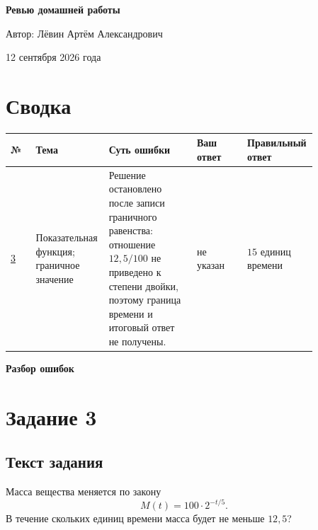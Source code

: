 \documentclass[12pt,a4paper]{article}
\begin{document}
\begin{titlepage}
\centering
\vspace*{0.24\textheight}

{\LARGE\bfseries Ревью домашней работы\par}
\vspace{18mm}
{\large Автор: Лёвин Артём Александрович\par}
\vspace{7mm}
{\large 12 сентября 2026 года\par}

\vfill
{}
\vspace*{8mm}
\end{titlepage}

\newpage
\section*{Сводка}
\small
\begin{tabular}{@{}p{0.08\linewidth}p{0.18\linewidth}p{0.28\linewidth}p{0.16\linewidth}p{0.16\linewidth}@{}}
\toprule
\textbf{№} & \textbf{Тема} & \textbf{Суть ошибки} & \textbf{Ваш ответ} & \textbf{Правильный ответ} \\
\midrule
\hyperref[task:3]{3} &
Показательная функция; граничное значение &
Решение остановлено после записи граничного равенства: отношение \(12{,}5/100\) не приведено к степени двойки, поэтому граница времени и итоговый ответ не получены. &
не указан &
\(15\) единиц времени \\
\bottomrule
\end{tabular}
\normalsize

\newpage
\thispagestyle{empty}
\vspace*{\fill}
\begin{center}
{\LARGE\bfseries Разбор ошибок}
\end{center}
\vspace*{\fill}

\newpage
{}\label{task:3}
\section*{Задание 3}

\subsection*{Текст задания}
Масса вещества меняется по закону
\[
M(t)=100\cdot 2^{-t/5}.
\]
В течение скольких единиц времени масса будет не меньше \(12{,}5\)?
\end{document}

